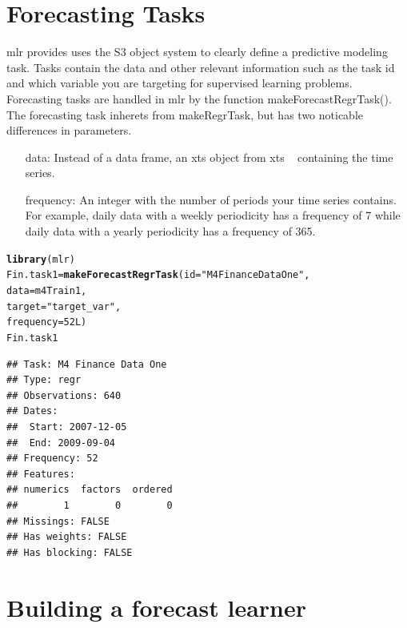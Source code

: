 \documentclass{article}\usepackage[]{graphicx}\usepackage[]{color}
\makeatletter
\newcommand{\hlnum}[1]{\textcolor[rgb]{0.686,0.059,0.569}{#1}}%
\newcommand{\hlstr}[1]{\textcolor[rgb]{0.192,0.494,0.8}{#1}}%
\newcommand{\hlstd}[1]{\textcolor[rgb]{0.345,0.345,0.345}{#1}}%
\newcommand{\hlkwb}[1]{\textcolor[rgb]{0.69,0.353,0.396}{#1}}%
\newcommand{\hlkwc}[1]{\textcolor[rgb]{0.333,0.667,0.333}{#1}}%
\newcommand{\hlkwd}[1]{\textcolor[rgb]{0.737,0.353,0.396}{\textbf{#1}}}%
\newenvironment{kframe}{%
 \def\at@end@of@kframe{}%
 \ifinner\ifhmode%
  \def\at@end@of@kframe{\end{minipage}}%
  \begin{minipage}{\columnwidth}%
 \fi\fi%
 \def\FrameCommand##1{\hskip\@totalleftmargin \hskip-\fboxsep
 \colorbox{shadecolor}{##1}\hskip-\fboxsep
     \hskip-\linewidth \hskip-\@totalleftmargin \hskip\columnwidth}%
 \MakeFramed {\advance\hsize-\width
   \@totalleftmargin\z@ \linewidth\hsize
   \@setminipage}}%
 {\par\unskip\endMakeFramed%
 \at@end@of@kframe}
\newenvironment{knitrout}{}{} %
\theoremstyle{definition}
\newcommand\code{\@codex}
\def\@codex#1{{\normalfont\ttfamily\hyphenchar\font=-1 #1}}
\newcommand{\pkg}[1]{{\fontseries{b}\selectfont #1}}
\makeatother
\begin{document}
\section{Forecasting Tasks}
\label{sec:task}

\pkg{mlr} provides uses the S3 object system to clearly define a predictive modeling task. Tasks contain the data and other relevant information such as the task id and which variable you are targeting for supervised learning problems. Forecasting tasks are handled in \pkg{mlr} by the function \code{makeForecastRegrTask()}. The forecasting task inherets from \code{makeRegrTask}, but has two noticable differences in parameters.

\begin{itemize}
\item[data:] Instead of a data frame, an xts object from \pkg{xts} ~\cite{xts} containing the time series.
\item[frequency:] An integer with the number of periods your time series contains. For example, daily data with a weekly periodicity has a frequency of 7 while daily data with a yearly periodicity has a frequency of 365.
\end{itemize}

\begin{knitrout}
\color{fgcolor}\begin{kframe}
\begin{alltt}
\hlkwd{library}\hlstd{(mlr)}
\hlstd{Fin.task1} \hlkwb{=} \hlkwd{makeForecastRegrTask}\hlstd{(}\hlkwc{id} \hlstd{=} \hlstr{"M4 Finance Data One"}\hlstd{,}
                                 \hlkwc{data} \hlstd{= m4Train1,}
                                 \hlkwc{target} \hlstd{=} \hlstr{"target_var"}\hlstd{,}
                                 \hlkwc{frequency} \hlstd{=} \hlnum{52L}\hlstd{)}
\hlstd{Fin.task1}
\end{alltt}
\begin{verbatim}
## Task: M4 Finance Data One
## Type: regr
## Observations: 640
## Dates:
##  Start: 2007-12-05 
##  End: 2009-09-04
## Frequency: 52
## Features:
## numerics  factors  ordered 
##        1        0        0 
## Missings: FALSE
## Has weights: FALSE
## Has blocking: FALSE
\end{verbatim}
\end{kframe}
\end{knitrout}

\section{Building a forecast learner}
\end{document}
